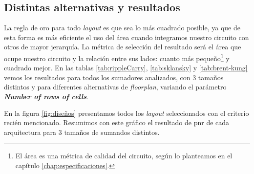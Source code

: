 \subsection{Distintas alternativas y resultados}
La regla de oro para todo \emph{layout} es que sea lo más cuadrado posible, ya que de esta forma es más eficiente el uso del área cuando integramos nuestro circuito con otros de mayor jerarquía. La métrica de selección del resultado será el área que ocupe nuestro circuito y la relación entre sus lados: cuanto más pequeño\footnote{El área es una métrica de calidad del circuito, según lo planteamos en el capítulo \ref{chap:especificaciones}.} y cuadrado mejor. En las tablas \ref{tab:rippleCarry}, \ref{tab:sklansky} y \ref{tab:brent-kung} vemos los resultados para todos los sumadores analizados, con 3 tamaños distintos y para diferentes alternativas de \emph{floorplan}, variando el parámetro \textbf{\emph{Number of rows of cells}}.

En la figura \ref{fig:diseños} presentamos todos los \emph{layout} seleccionados con el criterio recién mencionado. Resumimos con este gráfico el resultado de \gls{pnr} de cada arquitectura para 3 tamaños de sumandos distintos.
\begin{table}[h]
\centering
{}
\caption{Ubicación y conexionado para Ripple carry en 3 tamaños: 8, 16 y 32 bits. Las dimensiones de los lados y el área están en $\lambda$ y $\lambda^2$ respectivamente.}
\label{tab:rippleCarry}
\end{table}

